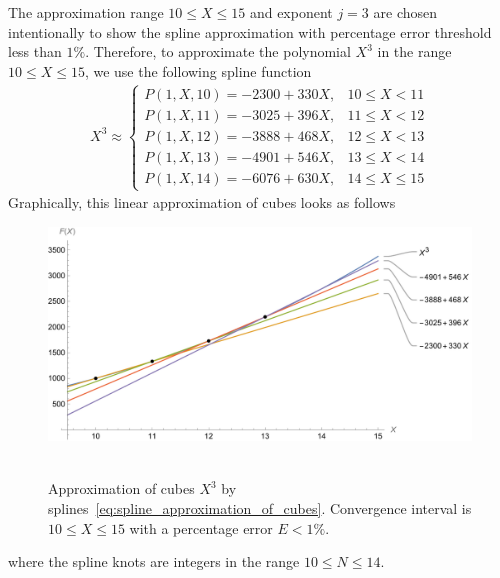 The approximation range $10 \leq X \leq 15$ and exponent $j=3$ are chosen intentionally to show the spline approximation with
percentage error threshold less than $1\%$.
Therefore, to approximate the polynomial $X^3$ in the range $10 \leq X \leq 15$, we use the following spline function
\begin{align}
    X^3 \approx
    \begin{cases}
        P(1,X,10) = -2300 + 330X, & 10 \leq X < 11 \\
        P(1,X,11) = -3025 + 396X, & 11 \leq X < 12 \\
        P(1,X,12) = -3888 + 468X, & 12 \leq X < 13 \\
        P(1,X,13) = -4901 + 546X, & 13 \leq X < 14 \\
        P(1,X,14) = -6076 + 630X, & 14 \leq X \leq 15
    \end{cases}
    \label{eq:spline_approximation_of_cubes}
\end{align}
Graphically, this linear approximation of cubes looks as follows
\begin{figure}[H]
    \centering
    \includegraphics[width=1\textwidth]{sections/images/08_plots_of_cubes_power_with_p_2_10_15}
    ~\caption{
        Approximation of cubes $X^3$ by splines~\eqref{eq:spline_approximation_of_cubes}.
        Convergence interval is $10 \leq X \leq 15$ with a percentage error $E < 1\%$.
    }
    \label{fig:08_plots_of_cubes_power_with_p_2_10_15}
\end{figure}
where the spline knots are integers in the range $10 \leq N \leq 14$.


